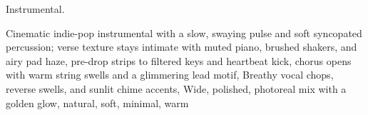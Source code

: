 
\begin{notes}
Instrumental.
\end{notes}
\begin{prompt}
Cinematic indie-pop instrumental with a slow, swaying pulse and soft syncopated percussion; verse texture stays intimate with muted piano, brushed shakers, and airy pad haze, pre-drop strips to filtered keys and heartbeat kick, chorus opens with warm string swells and a glimmering lead motif, Breathy vocal chops, reverse swells, and sunlit chime accents, Wide, polished, photoreal mix with a golden glow, natural, soft, minimal, warm
\end{prompt}

